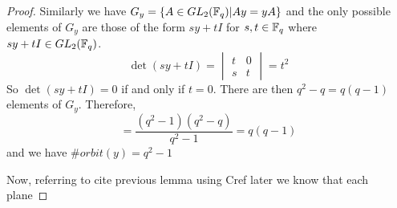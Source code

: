 \documentclass{amsart}
\begin{document}
\begin{proof}
    Similarly we have $G_y = \{A \in GL_2(\protect\mathbb{F}_q) | Ay = yA\}$ and the only possible elements of $G_y$ are those of the form $sy + tI$ for $s,t \in \protect\mathbb{F}_q$ where $sy+tI \in GL_2(\protect\mathbb{F}_q)$.
    \begin{equation*}
        \det(sy+tI) =
        \begin{vmatrix}
            t & 0 \\
            s & t
        \end{vmatrix} = t^2
    \end{equation*}
    So $\det(sy + tI) = 0$ if and only if $t = 0$. There are then $q^2 - q = q(q-1)$ elements of $G_y$. Therefore,
    \begin{equation*}
        [G:G_y] = \frac{(q^2-1)(q^2-q)}{q^2 - 1} = q(q-1)
    \end{equation*}
    and we have $\#orbit(y) = q^2 - 1$

    Now, referring to {\color{blue} cite previous lemma using Cref later} we know that each plane

    
    


\end{proof}
\end{document}
